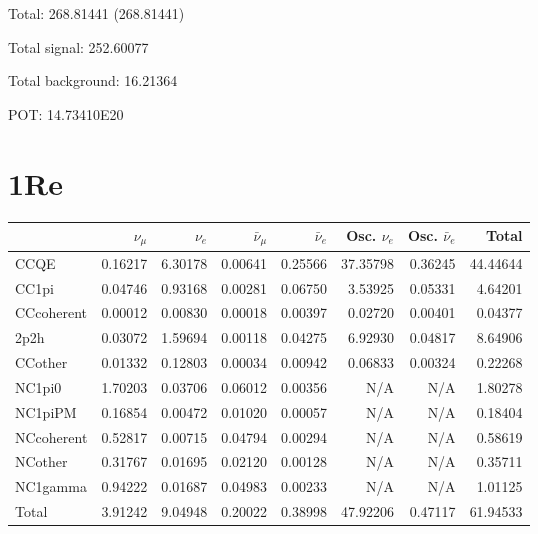 \documentclass[10pt,a4paper]{article}
\begin{document}
Total: 268.81441    (268.81441)


Total signal: 252.60077


Total background: 16.21364

POT: 14.73410E20


\section*{1Re}
\begin{tabular} { | l ||r | r | r | r | r | r | | r | }
\hline
              & $\nu_\mu$            & $\nu_e$              & $\bar{\nu}_{\mu}$    & $\bar{\nu}_{e}$      & Osc. $\nu_e$         & Osc. $\bar{\nu}_{e}$ & Total                \\ \hline\hline
 CCQE         & 0.16217              & 6.30178              & 0.00641              & 0.25566              & 37.35798             & 0.36245              & 44.44644             \\ \hline
 CC1pi        & 0.04746              & 0.93168              & 0.00281              & 0.06750              & 3.53925              & 0.05331              & 4.64201              \\ \hline
 CCcoherent   & 0.00012              & 0.00830              & 0.00018              & 0.00397              & 0.02720              & 0.00401              & 0.04377              \\ \hline
 2p2h         & 0.03072              & 1.59694              & 0.00118              & 0.04275              & 6.92930              & 0.04817              & 8.64906              \\ \hline
 CCother      & 0.01332              & 0.12803              & 0.00034              & 0.00942              & 0.06833              & 0.00324              & 0.22268              \\ \hline
 NC1pi0       & 1.70203              & 0.03706              & 0.06012              & 0.00356              & N/A                  & N/A                  & 1.80278              \\ \hline
 NC1piPM      & 0.16854              & 0.00472              & 0.01020              & 0.00057              & N/A                  & N/A                  & 0.18404              \\ \hline
 NCcoherent   & 0.52817              & 0.00715              & 0.04794              & 0.00294              & N/A                  & N/A                  & 0.58619              \\ \hline
 NCother      & 0.31767              & 0.01695              & 0.02120              & 0.00128              & N/A                  & N/A                  & 0.35711              \\ \hline
 NC1gamma     & 0.94222              & 0.01687              & 0.04983              & 0.00233              & N/A                  & N/A                  & 1.01125              \\ \hline
\hline
 Total        & 3.91242              & 9.04948              & 0.20022              & 0.38998              & 47.92206             & 0.47117              & 61.94533             \\ \hline

\end{tabular}
\end{document}
